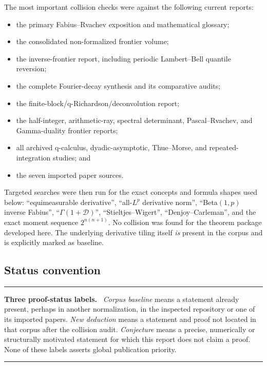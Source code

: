 \documentclass[11pt,oneside]{article}
\numberwithin{equation}{section}
\theoremstyle{plain}
\theoremstyle{definition}
\theoremstyle{remark}
\newcommand{\Dop}{\mathscr D}
\newenvironment{statusbox}[1]{%
  \par\medskip\noindent\begin{minipage}{\textwidth}%
  \color{DeepBlue}\hrule\vspace{5pt}%
  \color{black}\textbf{\color{DeepBlue}#1.}\ }{%
  \par\vspace{5pt}\color{DeepBlue}\hrule
  \end{minipage}\par\medskip}
\begin{document}
The most important collision checks were against the following current reports:
\begin{itemize}
\item the primary Fabius--Rvachev exposition and mathematical glossary;
\item the consolidated non-formalized frontier volume;
\item the inverse-frontier report, including periodic Lambert--Bell quantile reversion;
\item the complete Fourier-decay synthesis and its comparative audits;
\item the finite-block/q-Richardson/deconvolution report;
\item the half-integer, arithmetic-ray, spectral determinant, Pascal--Rvachev, and
      Gamma-duality frontier reports;
\item all archived q-calculus, dyadic-asymptotic, Thue--Morse, and repeated-integration
      studies; and
\item the seven imported paper sources.
\end{itemize}

Targeted searches were then run for the exact concepts and formula shapes used below:
``equimeasurable derivative'', ``all-$L^p$ derivative norm'', ``Beta$(1,p)$ inverse
Fabius'', ``$\Gamma(1+\Dop)$'', ``Stieltjes--Wigert'', ``Denjoy--Carleman'', and the exact
moment sequence $2^{n(n+1)}$.  No collision was found for the theorem package developed here.
The underlying derivative tiling itself \emph{is} present in the corpus and is explicitly
marked as baseline.

\subsection{Status convention}

\begin{statusbox}{Three proof-status labels}
\emph{Corpus baseline} means a statement already present, perhaps in another normalization,
in the inspected repository or one of its imported papers.  \emph{New deduction} means a
statement and proof not located in that corpus after the collision audit.  \emph{Conjecture}
means a precise, numerically or structurally motivated statement for which this report does
not claim a proof.  None of these labels asserts global publication priority.
\end{statusbox}
\end{document}
